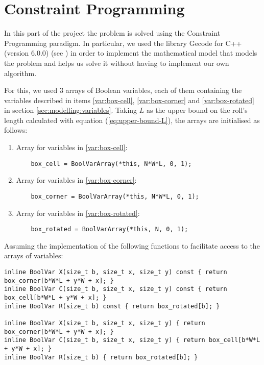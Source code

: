 \section{Constraint Programming}
\label{sec:constraint-programming}

In this part of the project the problem is solved using the Constraint Programming
paradigm. In particular, we used the library Gecode for C++ (version 6.0.0)
(see \cite{GecodeWEB}) in order to implement the mathematical model that models
the problem and helps us solve it without having to implement our own algorithm.

\hfill

For this, we used 3 arrays of Boolean variables, each of them containing the
variables described in items \ref{var:box-cell}, \ref{var:box-corner} and
\ref{var:box-rotated} in section \ref{sec:modelling:variables}. Taking $L$
as the upper bound on the roll's length calculated with equation
(\ref{eq:upper-bound-L}), the arrays are initialised as follows:

\begin{enumerate}
    \item Array for variables in \ref{var:box-cell}:
    
    {\NOINDENT \begin{lstlisting}
    box_cell = BoolVarArray(*this, N*W*L, 0, 1);
    \end{lstlisting}}
    
    \item Array for variables in \ref{var:box-corner}:
    
    {\NOINDENT \begin{lstlisting}
    box_corner = BoolVarArray(*this, N*W*L, 0, 1);
    \end{lstlisting}}
    
    \item Array for variables in \ref{var:box-rotated}:
    
    {\NOINDENT \begin{lstlisting}
    box_rotated = BoolVarArray(*this, N, 0, 1);
    \end{lstlisting}}
    
\end{enumerate}

Assuming the implementation of the following functions to facilitate
access to the arrays of variables:

{\NOINDENT \begin{lstlisting}
inline BoolVar X(size_t b, size_t x, size_t y) const { return box_corner[b*W*L + y*W + x]; }
inline BoolVar C(size_t b, size_t x, size_t y) const { return box_cell[b*W*L + y*W + x]; }
inline BoolVar R(size_t b) const { return box_rotated[b]; }

inline BoolVar X(size_t b, size_t x, size_t y) { return box_corner[b*W*L + y*W + x]; }
inline BoolVar C(size_t b, size_t x, size_t y) { return box_cell[b*W*L + y*W + x]; }
inline BoolVar R(size_t b) { return box_rotated[b]; }
\end{lstlisting}}

